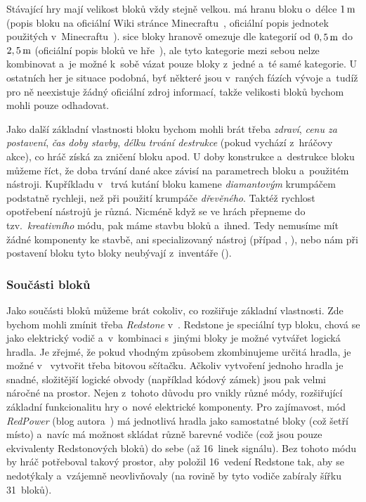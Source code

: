 Stávající hry mají velikost bloků vždy stejně velkou. \MC{} má hranu bloku o~délce $1\,\rm m$ (popis bloku na oficiální Wiki stránce Minecraftu~\citep{mc_block}, oficiální popis jednotek použitých v~Minecraftu~\citep{mc_units}). \SE{} sice bloky hranově omezuje dle kategorií od $0,5\,\rm m$ do $2,5\,\rm m$ (oficiální popis bloků ve hře~\citep{se_blocks_wiki}), ale tyto kategorie mezi sebou nelze kombinovat a~je možné k~sobě vázat pouze bloky z~jedné a~té samé kategorie. U ostatních her je situace podobná, byť některé jsou v~raných fázích vývoje a~tudíž pro ně neexistuje žádný oficiální zdroj informací, takže velikosti bloků bychom mohli pouze odhadovat. 

Jako další základní vlastnosti bloku bychom mohli brát třeba \textit{zdraví}, \textit{cenu za postavení}, \textit{čas doby stavby}, \textit{délku trvání destrukce} (pokud vychází z~hráčovy akce), co hráč získá za zničení bloku apod. U doby konstrukce a~destrukce bloku můžeme říct, že doba trvání dané akce závisí na parametrech bloku a~použitém nástroji. Kupříkladu v~ trvá kutání bloku kamene \textit{diamantovým} krumpáčem podstatně rychleji, než při použití krumpáče \textit{dřevěného}. Taktéž rychlost opotřebení nástrojů je různá. Nicméně když se ve hrách přepneme do tzv.~\textit{kreativního} módu, pak máme stavbu bloků  a~ihned. Tedy nemusíme mít žádné komponenty ke stavbě, ani specializovaný nástroj (případ \SE{}, \ME{}), nebo nám při postavení bloku tyto bloky neubývají z~inventáře (\MC{}). 

\subsubsection{Součásti bloků}
Jako součásti bloků můžeme brát cokoliv, co rozšiřuje základní vlastnosti. Zde bychom mohli zmínit třeba \textit{Redstone} v~. Redstone je speciální typ bloku, chová se jako elektrický vodič a~v~kombinaci s~jinými bloky je možné vytvářet logická hradla. Je zřejmé, že pokud vhodným způsobem zkombinujeme určitá hradla, je možné v~ vytvořit třeba bitovou sčítačku. Ačkoliv vytvoření jednoho hradla je snadné, složitější logické obvody (například kódový zámek) jsou pak velmi náročné na prostor. Nejen z~tohoto důvodu pro \MC{} vnikly různé módy, rozšiřující základní funkcionalitu hry o~nové elektrické komponenty. Pro zajímavost, mód \textit{RedPower} (blog autora~\citep{eloraam}) má jednotlivá hradla jako samostatné bloky (což šetří místo) a~navíc má možnost skládat různě barevné vodiče (což jsou pouze ekvivalenty Redstonových bloků) do sebe (až 16~linek signálu). Bez tohoto módu by hráč potřeboval takový prostor, aby položil 16~vedení Redstone tak, aby se nedotýkaly a~vzájemně neovlivňovaly (na rovině by tyto vodiče zabíraly šířku 31~bloků). 


